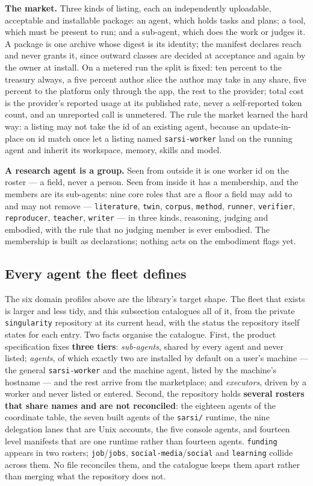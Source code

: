 \textbf{The market.} Three kinds of listing, each an independently uploadable, acceptable and installable package: an agent, which holds tasks and plans; a tool, which must be present to run; and a sub-agent, which does the work or judges it. A package is one archive whose digest is its identity; the manifest declares reach and never grants it, since outward classes are decided at acceptance and again by the owner at install. On a metered run the split is fixed: ten percent to the treasury always, a five percent author slice the author may take in any share, five percent to the platform only through the app, the rest to the provider; total cost is the provider's reported usage at its published rate, never a self-reported token count, and an unreported call is unmetered. The rule the market learned the hard way: a listing may not take the id of an existing agent, because an update-in-place on id match once let a listing named \texttt{sarsi-worker} land on the running agent and inherit its workspace, memory, skills and model.

\textbf{A research agent is a group.} Seen from outside it is one worker id on the roster --- a field, never a person. Seen from inside it has a membership, and the members are its sub-agents: nine core roles that are a floor a field may add to and may not remove --- \texttt{literature}, \texttt{twin}, \texttt{corpus}, \texttt{method}, \texttt{runner}, \texttt{verifier}, \texttt{reproducer}, \texttt{teacher}, \texttt{writer} --- in three kinds, reasoning, judging and embodied, with the rule that no judging member is ever embodied. The membership is built as declarations; nothing acts on the embodiment flags yet.

\subsection{Every agent the fleet defines}\label{sec:everyagent}

The six domain profiles above are the library's target shape. The fleet that exists is larger and less tidy, and this subsection catalogues all of it, from the private \texttt{singularity} repository at its current head, with the status the repository itself states for each entry. Two facts organise the catalogue. First, the product specification fixes \textbf{three tiers}: \emph{sub-agents}, shared by every agent and never listed; \emph{agents}, of which exactly two are installed by default on a user's machine --- the general \texttt{sarsi-worker} and the machine agent, listed by the machine's hostname --- and the rest arrive from the marketplace; and \emph{executors}, driven by a worker and never listed or entered. Second, the repository holds \textbf{several rosters that share names and are not reconciled}: the eighteen agents of the coordinate table, the seven built agents of the \texttt{sarsi/} runtime, the nine delegation lanes that are Unix accounts, the five console agents, and fourteen level manifests that are one runtime rather than fourteen agents. \texttt{funding} appears in two rosters; \texttt{job}/\texttt{jobs}, \texttt{social-media}/\texttt{social} and \texttt{learning} collide across them. No file reconciles them, and the catalogue keeps them apart rather than merging what the repository does not.

